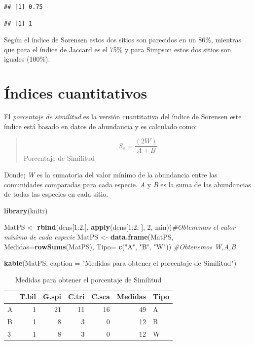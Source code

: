 \documentclass[]{book}
\newenvironment{Shaded}{\begin{snugshade}}{\end{snugshade}}
\newcommand{\KeywordTok}[1]{\textcolor[rgb]{0.13,0.29,0.53}{\textbf{{#1}}}}
\newcommand{\DataTypeTok}[1]{\textcolor[rgb]{0.13,0.29,0.53}{{#1}}}
\newcommand{\DecValTok}[1]{\textcolor[rgb]{0.00,0.00,0.81}{{#1}}}
\newcommand{\StringTok}[1]{\textcolor[rgb]{0.31,0.60,0.02}{{#1}}}
\newcommand{\CommentTok}[1]{\textcolor[rgb]{0.56,0.35,0.01}{\textit{{#1}}}}
\newcommand{\NormalTok}[1]{{#1}}
\begin{document}
\begin{verbatim}
## [1] 0.75
\end{verbatim}

\begin{verbatim}
## [1] 1
\end{verbatim}

Según el índice de Sorensen estos dos sitios son parecidos en un 86\%,
mientras que para el índice de Jaccard es el 75\% y para Simpson estos
dos sitios son iguales (100\%).

\section{Índices cuantitativos}\label{indices-cuantitativos}

El \emph{porcentaje de similitud} es la versión cuantitativa del índice
de Sorensen este índice está basado en datos de abundancia y es
calculado como:

\begin{quote}
\[S_s= \frac{(2W)}{A+B}\] Porcentaje de Similitud
\end{quote}

Donde; \emph{W} es la sumatoria del valor mínimo de la abundancia entre
las comunidades comparadas para cada especie. \emph{A} y \emph{B} es la
suma de las abundancias de todas las especies en cada sitio.

\begin{Shaded}
\begin{Highlighting}[]
\KeywordTok{library}\NormalTok{(knitr)}

\NormalTok{MatPS <-}\StringTok{ }\KeywordTok{rbind}\NormalTok{(dens[}\DecValTok{1}\NormalTok{:}\DecValTok{2}\NormalTok{,], }\KeywordTok{apply}\NormalTok{(dens[}\DecValTok{1}\NormalTok{:}\DecValTok{2}\NormalTok{, ], }\DecValTok{2}\NormalTok{, min))}\CommentTok{#Obtenemos el valor mínimo de cada especie}
\NormalTok{MatPS <-}\StringTok{ }\KeywordTok{data.frame}\NormalTok{(MatPS, }\DataTypeTok{Medidas=}\KeywordTok{rowSums}\NormalTok{(MatPS), }\DataTypeTok{Tipo=} \KeywordTok{c}\NormalTok{(}\StringTok{"A"}\NormalTok{, }\StringTok{"B"}\NormalTok{, }\StringTok{"W"}\NormalTok{)) }\CommentTok{#Obtenemos W,A,B}

\KeywordTok{kable}\NormalTok{(MatPS, }\DataTypeTok{caption =} \StringTok{"Medidas para obtener el porcentaje de Similitud"}\NormalTok{)}
\end{Highlighting}
\end{Shaded}

\begin{table}

\caption{\label{tab:unnamed-chunk-4}Medidas para obtener el porcentaje de Similitud}
\centering
\begin{tabular}[t]{l|r|r|r|r|r|l}
\hline
  & T.bil & G.spi & C.tri & C.sca & Medidas & Tipo\\
\hline
A & 1 & 21 & 11 & 16 & 49 & A\\
\hline
B & 1 & 8 & 3 & 0 & 12 & B\\
\hline
3 & 1 & 8 & 3 & 0 & 12 & W\\
\hline
\end{tabular}
\end{table}
\end{document}
